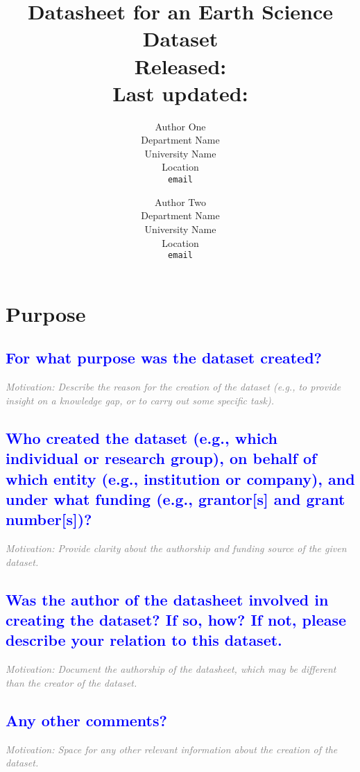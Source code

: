 \documentclass[letterpaper, 10 pt, transmag]{IEEEtran}
\title{
\LARGE \textbf{Datasheet for an Earth Science Dataset}
\\ \normalsize Released: %
\\ \footnotesize Last updated: %
}
\author{ Author One \\
	Department Name \\
	University Name \\
	Location \\
	\texttt{email} \\
	\and
	Author Two \\
	Department Name \\
	University Name \\
	Location \\
	\texttt{email} \\
}
\begin{document}
\maketitle
\thispagestyle{fancy}
\pagestyle{fancy}
\section{Purpose}

\textcolor{blue}{\subsection{For what purpose was the dataset created?}}
\textcolor{gray}{\textit{Motivation: Describe the reason for the creation of the dataset (e.g., to provide insight on a knowledge gap, or to carry out some specific task).}}

\textcolor{blue}{\subsection{Who created the dataset (e.g., which individual or research group), on behalf of which entity (e.g., institution or company), and under what funding (e.g., grantor[s] and grant number[s])?}}
\textcolor{gray}{\textit{Motivation: Provide clarity about the authorship and funding source of the given dataset.}}

\textcolor{blue}{\subsection{Was the author of the datasheet involved in creating the dataset? If so, how? If not, please describe your relation to this dataset.}}
\textcolor{gray}{\textit{Motivation: Document the authorship of the datasheet, which may be different than the creator of the dataset.}}

\textcolor{blue}{\subsection{Any other comments?}}
\textcolor{gray}{\textit{Motivation: Space for any other relevant information about the creation of the dataset.}}  

\vspace{10mm}
\end{document}
